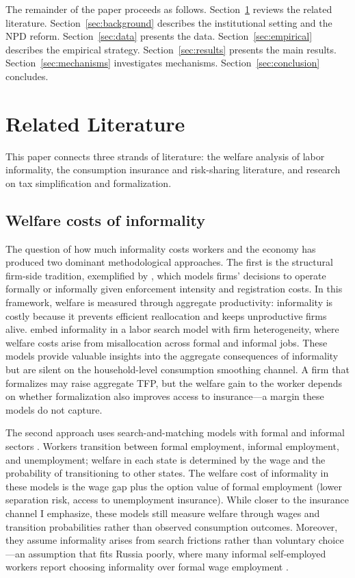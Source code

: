 \documentclass[12pt]{article}
\begin{document}
The remainder of the paper proceeds as follows. Section~\ref{sec:literature} reviews the related literature. Section~\ref{sec:background} describes the institutional setting and the NPD reform. Section~\ref{sec:data} presents the data. Section~\ref{sec:empirical} describes the empirical strategy. Section~\ref{sec:results} presents the main results. Section~\ref{sec:mechanisms} investigates mechanisms. Section~\ref{sec:conclusion} concludes.


\section{Related Literature}
\label{sec:literature}

This paper connects three strands of literature: the welfare analysis of labor informality, the consumption insurance and risk-sharing literature, and research on tax simplification and formalization.

\subsection{Welfare costs of informality}

The question of how much informality costs workers and the economy has produced two dominant methodological approaches. The first is the structural firm-side tradition, exemplified by \citet{Ulyssea2018}, which models firms' decisions to operate formally or informally given enforcement intensity and registration costs. In this framework, welfare is measured through aggregate productivity: informality is costly because it prevents efficient reallocation and keeps unproductive firms alive. \citet{Meghir2015} embed informality in a labor search model with firm heterogeneity, where welfare costs arise from misallocation across formal and informal jobs. These models provide valuable insights into the aggregate consequences of informality but are silent on the household-level consumption smoothing channel. A firm that formalizes may raise aggregate TFP, but the welfare gain to the worker depends on whether formalization also improves access to insurance---a margin these models do not capture.

The second approach uses search-and-matching models with formal and informal sectors \citep{BoeriGaribaldi2007, CharlotMalherbet2013, BoschEstebanPretel2012}. Workers transition between formal employment, informal employment, and unemployment; welfare in each state is determined by the wage and the probability of transitioning to other states. The welfare cost of informality in these models is the wage gap plus the option value of formal employment (lower separation risk, access to unemployment insurance). While closer to the insurance channel I emphasize, these models still measure welfare through wages and transition probabilities rather than observed consumption outcomes. Moreover, they assume informality arises from search frictions rather than voluntary choice---an assumption that fits Russia poorly, where many informal self-employed workers report choosing informality over formal wage employment \citep{Maloney2004}.
\end{document}
